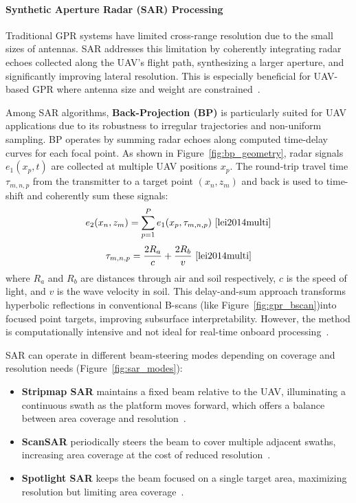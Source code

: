 

\paragraph{Synthetic Aperture Radar (SAR) Processing}

Traditional GPR systems have limited cross-range resolution due to the small sizes of antennas. SAR addresses this limitation by coherently integrating radar echoes collected along the UAV’s flight path, synthesizing a larger aperture, and significantly improving lateral resolution. This is especially beneficial for UAV-based GPR where antenna size and weight are constrained~\cite{alqudsi2021review}.

Among SAR algorithms, \textbf{Back-Projection (BP)} is particularly suited for UAV applications due to its robustness to irregular trajectories and non-uniform sampling. BP operates by summing radar echoes along computed time-delay curves for each focal point. As shown in Figure~\ref{fig:bp_geometry}, radar signals $e_1(x_p, t)$ are collected at multiple UAV positions $x_p$. The round-trip travel time $\tau_{m,n,p}$ from the transmitter to a target point $(x_n, z_m)$ and back is used to time-shift and coherently sum these signals:
\[
e_2(x_n, z_m) = \sum_{p=1}^{P} e_1(x_p, \tau_{m,n,p})~\cite{lei2014multi}
\]
\[
\tau_{m,n,p} = \frac{2R_a}{c} + \frac{2R_b}{v}~\cite{lei2014multi}
\]
where $R_a$ and $R_b$ are distances through air and soil respectively, $c$ is the speed of light, and $v$ is the wave velocity in soil. This delay-and-sum approach transforms hyperbolic reflections in conventional B-scans (like Figure~\ref{fig:gpr_bscan})into focused point targets, improving subsurface interpretability. However, the method is computationally intensive and not ideal for real-time onboard processing~\cite{lei2014multi}.

SAR can operate in different beam-steering modes depending on coverage and resolution needs (Figure~\ref{fig:sar_modes}):

\begin{itemize}
    \item \textbf{Stripmap SAR} maintains a fixed beam relative to the UAV, illuminating a continuous swath as the platform moves forward, which offers a balance between area coverage and resolution~\cite{moreira2013tutorial}.
    \item \textbf{ScanSAR} periodically steers the beam to cover multiple adjacent swaths, increasing area coverage at the cost of reduced resolution~\cite{moreira2013tutorial}.
    \item \textbf{Spotlight SAR} keeps the beam focused on a single target area, maximizing resolution but limiting area coverage~\cite{moreira2013tutorial}.
\end{itemize}

